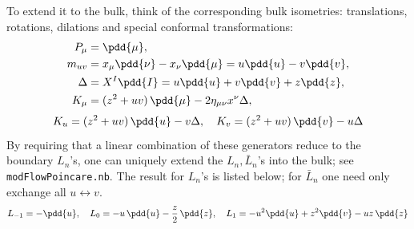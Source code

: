 \documentclass[a4paper
	,10pt
]{article}
\begin{document}
	To extend it to the bulk, think of the corresponding bulk isometries: translations, rotations, dilations and special conformal transformations:
	\begin{equation}
	\begin{aligned}
		P_\mu
		&= \pdd{\mu},\\
		m_{uv}
		&= x_\mu \pdd{\nu} - x_\nu \pdd{\mu}
		= u\pdd{u} - v\pdd{v},\\
		\Delta
		&= X^I \pdd{I}
		= u\pdd{u} + v\pdd{v} + z\pdd{z},\\
		K_\mu
		&= (z^2 + uv)\,\pdd{\mu}
			- 2\eta_{\mu\nu} x^\nu \Delta,
	\end{aligned}
	\end{equation}
	\begin{equation}
		K_u = (z^2 + uv)\,\pdd{u} - v \Delta,
	\quad
		K_v = (z^2 + uv)\,\pdd{v} - u \Delta
	\end{equation}
	By requiring that a linear combination of these generators reduce to the boundary $L_n$'s, one can uniquely extend the $L_n,\bar{L}_n$'s into the bulk; see \texttt{modFlowPoincare.nb}. The result for $L_n$'s is listed below; for $\bar{L}_n$ one need only exchange all $u\leftrightarrow v$.
	\begin{equation}
		L_{-1} = -\pdd{u},
	\quad
		L_0 = -u\,\pdd{u} - \frac{z}{2}\,\pdd{z},
	\quad
		L_1 = -u^2\pdd{u} + z^2 \pdd{v}
			- uz\,\pdd{z}
	\end{equation}
\end{document}
